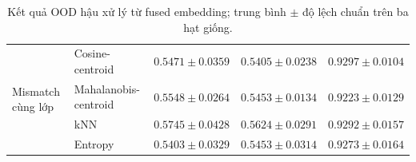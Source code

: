 \begin{table}[H]
{\begin{tabular}{|l|l|c|c|c|}
\multirow{4}{*}{Mismatch cùng lớp} & Cosine-centroid & $0.5471\pm0.0359$ & $0.5405\pm0.0238$ & $0.9297\pm0.0104$ \\ \cline{2-5}
 & Mahalanobis-centroid & $0.5548\pm0.0264$ & $0.5453\pm0.0134$ & $\mathbf{0.9223\pm0.0129}$ \\ \cline{2-5}
 & kNN & $\mathbf{0.5745\pm0.0428}$ & $\mathbf{0.5624\pm0.0291}$ & $0.9292\pm0.0157$ \\ \cline{2-5}
 & Entropy & $0.5403\pm0.0329$ & $0.5453\pm0.0314$ & $0.9273\pm0.0164$ \\ \hline
\end{tabular}
}
\caption{Kết quả OOD hậu xử lý từ fused embedding; trung bình $\pm$ độ lệch chuẩn trên ba hạt giống.}
\label{tab:ch4draft_ood}
\end{table}
